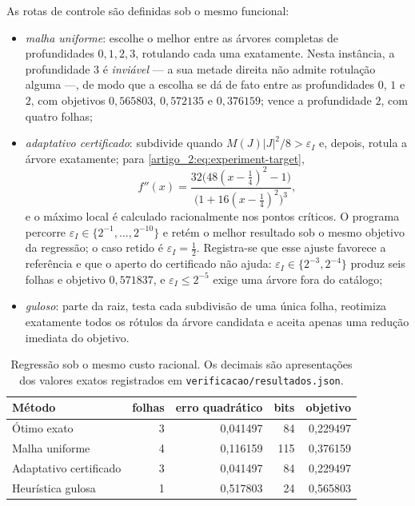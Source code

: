 \documentclass[12pt,a4paper]{article}
\theoremstyle{preciso}
\theoremstyle{definition}
\theoremstyle{preciso}
\theoremstyle{preciso}
\theoremstyle{preciso}
\theoremstyle{preciso}
\theoremstyle{definition}
\theoremstyle{preciso}
\theoremstyle{definition}
\theoremstyle{preciso}
\theoremstyle{preciso}
\theoremstyle{definition}
\begin{document}
As rotas de controle são definidas sob o mesmo funcional:
\begin{itemize}[leftmargin=1.7em]
 \item \emph{malha uniforme}: escolhe o melhor entre as árvores completas de
 profundidades $0,1,2,3$, rotulando cada uma exatamente. Nesta instância, a
 profundidade $3$ é \emph{inviável} --- a sua metade direita não admite
 rotulação alguma ---, de modo que a escolha se dá de fato entre as
 profundidades $0$, $1$ e $2$, com objetivos $0{,}565803$, $0{,}572135$ e
 $0{,}376159$; vence a profundidade $2$, com quatro folhas;
 \item \emph{adaptativo certificado}: subdivide quando
 $M(J)|J|^2/8>\varepsilon_I$ e, depois, rotula a árvore exatamente; para
 \eqref{artigo_2:eq:experiment-target},
 \[
 f''(x)=
 \frac{32\bigl(48(x-\tfrac14)^2-1\bigr)}
      {\bigl(1+16(x-\tfrac14)^2\bigr)^3},
 \]
 e o máximo local é calculado racionalmente nos pontos críticos. O programa
 percorre $\varepsilon_I\in\{2^{-1},\dots,2^{-10}\}$ e retém o melhor
 resultado sob o mesmo objetivo da regressão; o caso retido é
 $\varepsilon_I=\tfrac12$. Registra-se que esse ajuste favorece a referência
 e que o aperto do certificado não ajuda: $\varepsilon_I\in\{2^{-3},2^{-4}\}$
 produz seis folhas e objetivo $0{,}571837$, e $\varepsilon_I\le2^{-5}$ exige
 uma árvore fora do catálogo;
 \item \emph{guloso}: parte da raiz, testa cada subdivisão de uma única folha,
 reotimiza exatamente todos os rótulos da árvore candidata e aceita apenas
 uma redução imediata do objetivo.
\end{itemize}

\begin{table}[t]
 \centering
 \caption{Regressão sob o mesmo custo racional. Os decimais são
 apresentações dos valores exatos registrados em
 \texttt{verificacao/resultados.json}.}
 \label{artigo_2:tab:selector-comparison}
 \small
 \begin{tabular}{lrrrr}
\toprule
Método & folhas & erro quadrático & bits & objetivo \\
\midrule
Ótimo exato & 3 & 0{,}041497 & 84 & 0{,}229497 \\
Malha uniforme & 4 & 0{,}116159 & 115 & 0{,}376159 \\
Adaptativo certificado & 3 & 0{,}041497 & 84 & 0{,}229497 \\
Heurística gulosa & 1 & 0{,}517803 & 24 & 0{,}565803 \\
\bottomrule
\end{tabular}

\end{table}
\end{document}
